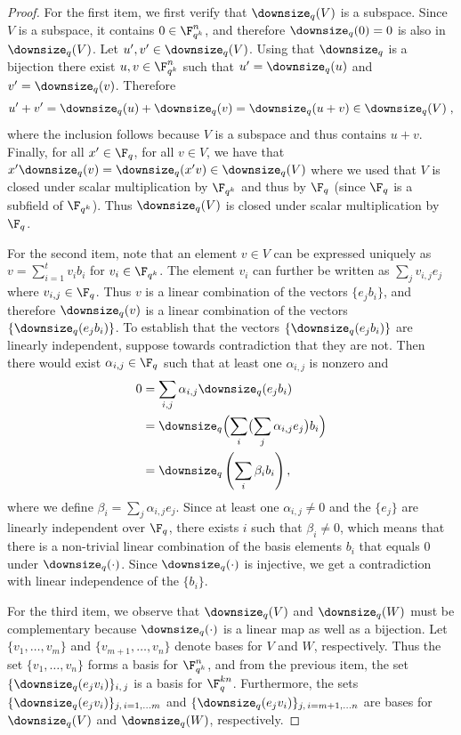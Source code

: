 \begin{proof}
  For the first item, we first verify that $\downsize_q(V)$ is a subspace.
  Since $V$ is a subspace, it contains $0 \in \F_{q^k}^n$, and therefore $\downsize_q(0)
  = 0$ is also in $\downsize_q(V)$.
  Let $u', v' \in \downsize_q(V)$.
  Using that $\downsize_q$ is a bijection there exist $u,v \in \F_{q^k}^n$ such that
  $u' = \downsize_q(u)$ and $v' = \downsize_q(v)$. Therefore
  \[
    u' + v' = \downsize_q(u) + \downsize_q(v) =
    \downsize_q(u + v) \in \downsize_q(V)\;,
  \]
  where the inclusion follows because $V$ is a subspace and thus contains $u +
  v$.
  Finally, for all $x' \in \F_{q}$, for all $v \in V$, we have that $x'
  \downsize_q(v) = \downsize_q(x' v)\in \downsize_q(V)$ where we used that $V$
  is closed under scalar multiplication by $\F_{q^k}$ and thus by $\F_q$ (since
  $\F_q$ is a subfield of $\F_{q^k}$).
  Thus $\downsize_q(V)$ is closed under scalar multiplication by $\F_{q}$.

  For the second item, note that an element $v \in V$ can be expressed uniquely
  as $v = \sum_{i = 1}^t v_i b_i$ for $v_i \in \F_{q^k}$.
  The element $v_i$ can further be written as $\sum_j v_{i, j} e_j$ where $v_{i,
    j} \in \F_q$.
  Thus $v$ is a linear combination of the vectors $\{ e_j b_i \}$, and therefore
  $\downsize_q(v)$ is a linear combination of the vectors $\{ \downsize_q (e_j
  b_i) \}$.
  To establish that the vectors $\{ \downsize_q(e_j b_i) \}$ are linearly
  independent, suppose towards contradiction that they are not.
  Then there would exist $\alpha_{i, j} \in \F_q$ such that at least one
  $\alpha_{i, j}$ is nonzero and
  \begin{align*}
    0 & = \sum_{i,j} \alpha_{i, j} \downsize_q(e_j b_i) \\
      & = \downsize_q \Bigl( \sum_i \bigl (\sum_j \alpha_{i, j}
        e_j \bigr) b_i \Bigr) \\
      & = \downsize_q \left ( \sum_i \beta_i b_i \right ),
  \end{align*}
  where we define $\beta_i = \sum_j \alpha_{i, j} e_j$.
  Since at least one $\alpha_{i, j} \neq 0$ and the $\{e_j\}$ are linearly
  independent over $\F_q$, there exists $i$ such that $\beta_i \neq 0$, which
  means that there is a non-trivial linear combination of the basis elements
  $b_i$ that equals $0$ under $\downsize_q(\cdot)$.
  Since $\downsize_q(\cdot)$ is injective, we get a contradiction with linear
  independence of the $\{b_i\}$.

  For the third item, we observe that $\downsize_q(V)$ and $\downsize_q(W)$ must
  be complementary because $\downsize_q(\cdot)$ is a linear map as well as a
  bijection.
  Let $\{v_1,\ldots,v_m\}$ and $\{v_{m+1},\ldots,v_n\}$ denote bases for $V$ and
  $W$, respectively.
  Thus the set $\{v_1,\ldots,v_n\}$ forms a basis for $\F_{q^k}^n$, and from the
  previous item, the set $\{ \downsize_q(e_j v_i) \}_{i,\, j}$ is a basis for
  $\F_q^{kn}$.
  Furthermore, the sets $\{ \downsize_q(e_j v_i) \}_{j,\,i = 1,\ldots m}$ and
  $\{ \downsize_q(e_j v_i) \}_{j,\, i = m+1,\ldots n}$ are bases for
  $\downsize_q(V)$ and $\downsize_q(W)$, respectively.


\end{proof}
